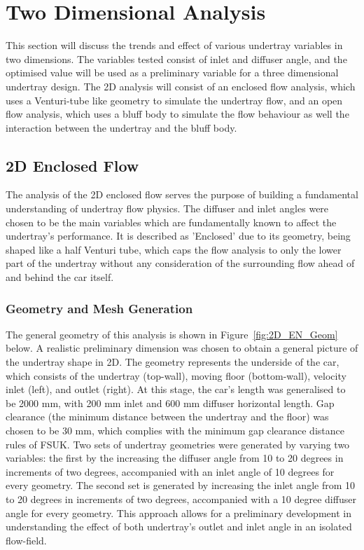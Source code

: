 
\section{Two Dimensional Analysis}
This section will discuss the trends and effect of various undertray variables in two dimensions. The variables tested consist of inlet and diffuser angle, and the optimised value will be used as a preliminary variable for a three dimensional undertray design. The 2D analysis will consist of an enclosed flow analysis, which uses a Venturi-tube like geometry to simulate the undertray flow, and an open flow analysis, which uses a bluff body to simulate the flow behaviour as well the interaction between the undertray and the bluff body. 

\subsection{2D Enclosed Flow}
The analysis of the 2D enclosed flow serves the purpose of building a fundamental understanding of undertray flow physics. The diffuser and inlet angles were chosen to be the main variables which are fundamentally known to affect the undertray's performance. It is described as 'Enclosed' due to its geometry, being shaped like a half Venturi tube, which caps the flow analysis to only the lower part of the undertray without any consideration of the surrounding flow ahead of and behind the car itself. 

\subsubsection{Geometry and Mesh Generation}
\noindent The general geometry of this analysis is shown in Figure~\ref{fig:2D_EN_Geom} below. A realistic preliminary dimension was chosen to obtain a general picture of the undertray shape in 2D. The geometry represents the underside of the car, which consists of the undertray (top-wall), moving floor (bottom-wall), velocity inlet (left), and outlet (right). At this stage, the car's length was generalised to be 2000 mm, with 200 mm inlet and 600 mm diffuser horizontal length. Gap clearance (the minimum distance between the undertray and the floor) was chosen to be 30 mm, which complies with the minimum gap clearance distance rules of FSUK. Two sets of undertray geometries were generated by varying two variables: the first by the increasing the diffuser angle from 10 to 20 degrees in increments of two degrees, accompanied with an inlet angle of 10 degrees for every geometry. The second set is generated by increasing the inlet angle from 10 to 20 degrees in increments of two degrees, accompanied with a 10 degree diffuser angle for every geometry. This approach allows for a preliminary development in understanding the effect of both undertray's outlet and inlet angle in an isolated flow-field. 

